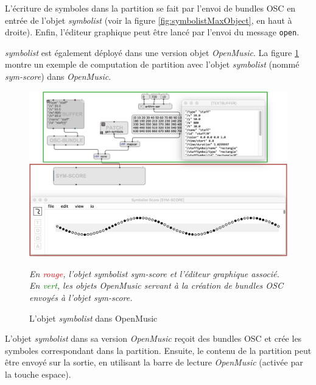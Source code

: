 L'écriture de symboles dans la partition se fait par l'envoi de bundles OSC en entrée de l'objet \textit{symbolist} (voir la figure \ref{fig:symbolistMaxObject}, en haut à droite). 
Enfin, l'éditeur graphique peut être lancé par l'envoi du message \lstinline|open|.

\textit{symbolist} est également déployé dans une version objet \textit{OpenMusic}. La figure \ref{fig:symbolistOMObject} montre un exemple de computation de partition avec l'objet \textit{symbolist} (nommé \textit{sym-score}) dans \textit{OpenMusic}.

\begin{figure}[H]
	\centering
	\includegraphics[keepaspectratio=true, width=\textwidth]{PresentationDeSymbolist/i/symbolistOMObject.png}
	\caption{L'objet \textit{symbolist} dans OpenMusic}
	\label{fig:symbolistOMObject}
	\small
	\it
	En \textcolor{red}{rouge}, l'objet \emph{symbolist} \og sym-score \fg et l'éditeur graphique associé.
	En \textcolor{green}{vert}, les objets \emph{OpenMusic} servant à la création de bundles OSC envoyés à l'objet \emph{sym-score}.
\end{figure}

L'objet \textit{symbolist} dans sa version \textit{OpenMusic} reçoit des bundles OSC et crée les symboles correspondant dans la partition. Ensuite, le contenu de la partition peut être envoyé sur la sortie, en utilisant la barre de lecture \textit{OpenMusic} (activée par la touche espace).    

